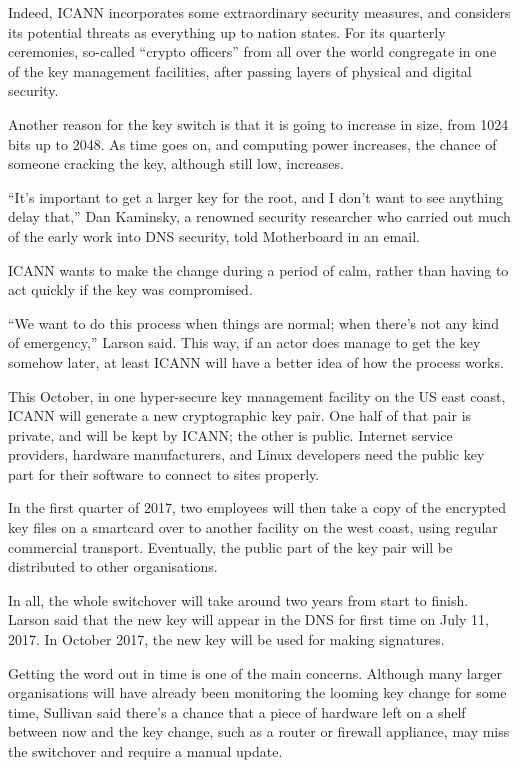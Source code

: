 \documentclass{article}
\begin{document}
Indeed, ICANN incorporates some extraordinary security measures, and considers
its potential threats as everything up to nation states. For its quarterly
ceremonies, so-called “crypto officers” from all over the world congregate in
one of the key management facilities, after passing layers of physical and
digital security.

Another reason for the key switch is that it is going to increase in size, from
1024 bits up to 2048. As time goes on, and computing power increases, the
chance of someone cracking the key, although still low, increases.

“It's important to get a larger key for the root, and I don't want to see
anything delay that,” Dan Kaminsky, a renowned security researcher who carried
out much of the early work into DNS security, told Motherboard in an email.

ICANN wants to make the change during a period of calm, rather than having to
act quickly if the key was compromised.

“We want to do this process when things are normal; when there's not any kind
of emergency,” Larson said. This way, if an actor does manage to get the key
somehow later, at least ICANN will have a better idea of how the process works.

This October, in one hyper-secure key management facility on the US east coast,
ICANN will generate a new cryptographic key pair. One half of that pair is
private, and will be kept by ICANN; the other is public. Internet service
providers, hardware manufacturers, and Linux developers need the public key
part for their software to connect to sites properly.

In the first quarter of 2017, two employees will then take a copy of the
encrypted key files on a smartcard over to another facility on the west coast,
using regular commercial transport. Eventually, the public part of the key pair
will be distributed to other organisations.

In all, the whole switchover will take around two years from start to finish.
Larson said that the new key will appear in the DNS for first time on July 11,
2017. In October 2017, the new key will be used for making signatures.

Getting the word out in time is one of the main concerns. Although many larger
organisations will have already been monitoring the looming key change for some
time, Sullivan said there’s a chance that a piece of hardware left on a shelf
between now and the key change, such as a router or firewall appliance, may
miss the switchover and require a manual update.
\end{document}
